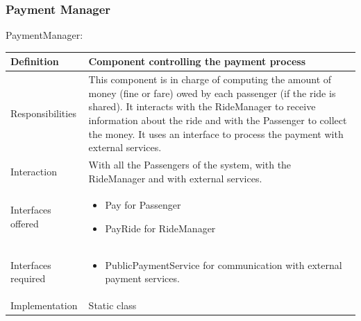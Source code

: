 \documentclass[a4paper,11pt]{report} %
\begin{document}
	\subsubsection{Payment Manager}
	\begin{minipage}{\linewidth}
	\end{minipage} \linebreak
	\centerline{PaymentManager:}
	\begin{center}
		\begin{tabular}{| l | p{9cm} |}\hline
			Definition & Component controlling the payment process\\\hline
			Responsibilities & This component is in charge of computing the amount of money (fine or fare) owed by each passenger (if the ride is shared). It interacts with the RideManager to receive information about the ride and with the Passenger to collect the money. It uses an interface to process the payment with external services.\\\hline
			Interaction & With all the Passengers of the system, with the RideManager and with external services.\\\hline
			Interfaces offered & \begin{itemize}
				\item Pay for Passenger
				\item PayRide for RideManager
			\end{itemize}\\\hline
			Interfaces required & \begin{itemize}
				\item PublicPaymentService for communication with external payment services.
			\end{itemize}\\\hline
			Implementation & Static class\\\hline
		\end{tabular}
	\end{center}
\end{document}
